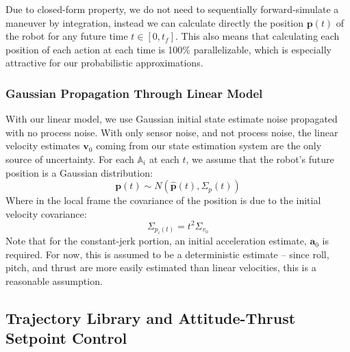 \documentclass{llncs}
\begin{document}
Due to closed-form property, we do not need to sequentially forward-simulate a maneuver by integration, instead we can calculate directly the position $\mathbf{p}(t)$ of the robot for any future time $t \in [0,t_f]$. This also means that calculating each position of each action at each time is 100\% parallelizable, which is especially attractive for our probabilistic approximations.

\subsubsection{Gaussian Propagation Through Linear Model}

With our linear model, we use Gaussian initial state estimate noise propagated with no process noise.  With only sensor noise, and not process noise, the linear velocity estimates $\mathbf{v}_0$ coming from our state estimation system are the only source of uncertainty.  For each $\mathbb{A}_i$ at each $t$, we assume that the robot's future position is a Gaussian distribution: 
%
$$\mathbf{p}(t) \sim N(\mathbf{\hat{p}}(t), \Sigma_p(t))$$
%
Where in the local frame the covariance of the position is due to the initial velocity covariance:
$$ \Sigma_{p_i(t)} = t^2 \Sigma_{v_0}$$
%
%
Note that for the constant-jerk portion, an initial acceleration estimate, $\textbf{a}_0$ is required.  For now, this is assumed to be a deterministic estimate -- since roll, pitch, and thrust are more easily estimated than linear velocities, this is a reasonable assumption.

\subsection{Trajectory Library and Attitude-Thrust Setpoint Control}
\end{document}
